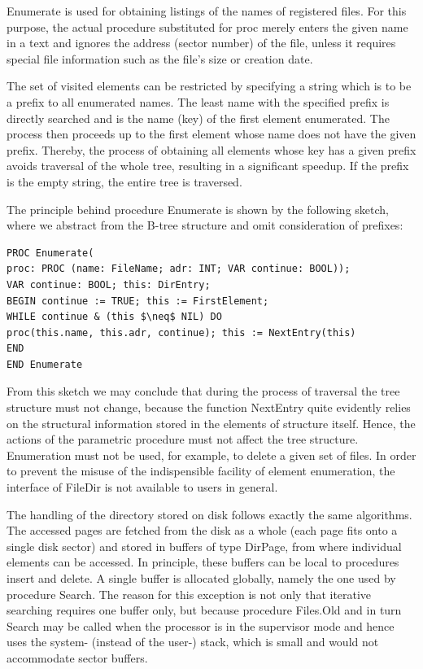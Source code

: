 Enumerate is used for obtaining listings of the names of registered files. For this purpose, the
actual procedure substituted for proc merely enters the given name in a text and ignores the
address (sector number) of the file, unless it requires special file information such as the file's
size or creation date.

The set of visited elements can be restricted by specifying a string which is to be a prefix to all
enumerated names. The least name with the specified prefix is directly searched and is the name
(key) of the first element enumerated. The process then proceeds up to the first element whose
name does not have the given prefix. Thereby, the process of obtaining all elements whose key
has a given prefix avoids traversal of the whole tree, resulting in a significant speedup. If the
prefix is the empty string, the entire tree is traversed.

The principle behind procedure Enumerate is shown by the following sketch, where we abstract
from the B-tree structure and omit consideration of prefixes:
\begin{verbatim}
PROC Enumerate(
proc: PROC (name: FileName; adr: INT; VAR continue: BOOL));
VAR continue: BOOL; this: DirEntry;
BEGIN continue := TRUE; this := FirstElement;
WHILE continue & (this $\neq$ NIL) DO
proc(this.name, this.adr, continue); this := NextEntry(this)
END
END Enumerate
\end{verbatim}
From this sketch we may conclude that during the process of traversal the tree structure must not
change, because the function NextEntry quite evidently relies on the structural information stored
in the elements of structure itself. Hence, the actions of the parametric procedure must not affect
the tree structure. Enumeration must not be used, for example, to delete a given set of files. In
order to prevent the misuse of the indispensible facility of element enumeration, the interface of
FileDir is not available to users in general.

The handling of the directory stored on disk follows exactly the same algorithms. The accessed
pages are fetched from the disk as a whole (each page fits onto a single disk sector) and stored
in buffers of type DirPage, from where individual elements can be accessed. In principle, these
buffers can be local to procedures insert and delete. A single buffer is allocated globally, namely
the one used by procedure Search. The reason for this exception is not only that iterative
searching requires one buffer only, but because procedure Files.Old and in turn Search may be
called when the processor is in the supervisor mode and hence uses the system- (instead of the
user-) stack, which is small and would not accommodate sector buffers.


